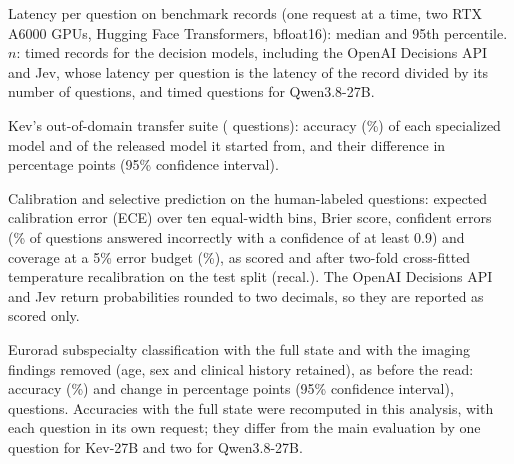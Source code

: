 \begin{table}[!h]
  \caption{Latency per question on  benchmark records (one request at a time, two RTX A6000 GPUs, Hugging Face Transformers, bfloat16): median and 95th percentile. $n$: timed records for the decision models, including the OpenAI Decisions API and Jev, whose latency per question is the latency of the record divided by its number of questions, and timed questions for Qwen3.8-27B.}
  \label{tab:v3_latency}
  \centering\footnotesize\setlength{\tabcolsep}{4pt}
  
\end{table}

\begin{table}[!h]
  \caption{Kev's out-of-domain transfer suite ( questions): accuracy (\%) of each specialized model and of the released model it started from, and their difference in percentage points (95\% confidence interval).}
  \label{tab:v3_transfer}
  \centering\footnotesize\setlength{\tabcolsep}{4pt}
  
\end{table}

\begin{table}[!h]
  \caption{Calibration and selective prediction on the human-labeled questions: expected calibration error (ECE) over ten equal-width bins, Brier score, confident errors (\% of questions answered incorrectly with a confidence of at least 0.9) and coverage at a 5\% error budget (\%), as scored and after two-fold cross-fitted temperature recalibration on the test split (recal.). The OpenAI Decisions API and Jev return probabilities rounded to two decimals, so they are reported as scored only.}
  \label{tab:v3_calib}
  \centering\scriptsize\setlength{\tabcolsep}{3pt}
  
\end{table}

\begin{table}[!h]
  \caption{Eurorad subspecialty classification with the full state and with the imaging findings removed (age, sex and clinical history retained), as before the read: accuracy (\%) and change in percentage points (95\% confidence interval),  questions. Accuracies with the full state were recomputed in this analysis, with each question in its own request; they differ from the main evaluation by one question for Kev-27B and two for Qwen3.8-27B.}
  \label{tab:v3_preread}
  \centering\footnotesize\setlength{\tabcolsep}{4pt}
  
\end{table}

